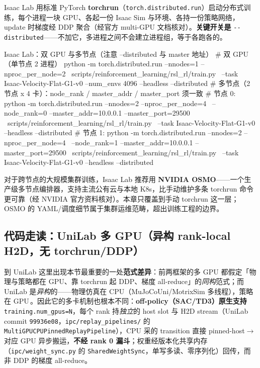 Isaac Lab 用标准 PyTorch \textbf{torchrun}（\verb|torch.distributed.run|）启动分布式训练，每个进程一块 GPU、各起一份 Isaac Sim 与环境、各持一份策略网络，update 时梯度经 DDP 聚合（经官方 multi-GPU 文档核对）\cite{mittal2025isaaclab}。\textbf{关键开关是} \verb|--distributed|——不加它，多进程之间不会建立进程组，等于各跑各的。

\begin{codebox}[bash]{Isaac Lab：双 GPU 与多节点（注意 --distributed 与 master 地址）}
# 双 GPU（单节点 2 进程）
python -m torch.distributed.run --nnodes=1 --nproc_per_node=2 \
    scripts/reinforcement_learning/rsl_rl/train.py \
    --task Isaac-Velocity-Flat-G1-v0 --num_envs 4096 --headless --distributed
# 多节点（2 节点 x 4 卡）：node_rank / master_addr / master_port 须一致
# 节点 0:
python -m torch.distributed.run --nnodes=2 --nproc_per_node=4 \
    --node_rank=0 --master_addr=10.0.0.1 --master_port=29500 \
    scripts/reinforcement_learning/rsl_rl/train.py \
    --task Isaac-Velocity-Flat-G1-v0 --headless --distributed
# 节点 1:
python -m torch.distributed.run --nnodes=2 --nproc_per_node=4 \
    --node_rank=1 --master_addr=10.0.0.1 --master_port=29500 \
    scripts/reinforcement_learning/rsl_rl/train.py \
    --task Isaac-Velocity-Flat-G1-v0 --headless --distributed
\end{codebox}

\begin{note}[大规模集群（$>8$ GPU）：NVIDIA OSMO]
对于跨节点的大规模集群训练，Isaac Lab 推荐用 \textbf{NVIDIA OSMO}——一个生产级多节点编排器，支持主流公有云与本地 K8s，比手动维护多条 torchrun 命令更可靠（经 NVIDIA 官方资料核对）\cite{mittal2025isaaclab}。本章只覆盖到手动 torchrun 这一层；OSMO 的 YAML/调度细节属于集群运维范畴，超出训练工程的边界。
\end{note}

\subsection{代码走读：UniLab 多 GPU（异构 rank-local H2D，无 torchrun/DDP）}
\label{sec:rlmc-ls-unilab-multigpu}

到 UniLab 这里出现本节最重要的一处\textbf{范式差异}：前两框架的多 GPU 都假定「物理与策略都在 GPU、靠 torchrun 起 DDP、梯度 all-reduce」的\emph{同构}范式；而 UniLab 是\emph{异构}的——物理仿真在 CPU（MuJoCoUni/MotrixSim 多线程），策略在 GPU\,\cite{unilab2026}。因此它的多卡机制也根本不同：\textbf{off-policy（SAC/TD3）原生支持} \verb|training.num_gpus=N|，每个 rank 持\emph{独立}的 host slot 与 H2D stream（UniLab commit \texttt{99936e08}，\verb|ipc/replay_pipelines/| 的 \verb|MultiGPUCPUPinnedReplayPipeline|），CPU 采的 transition 直接 pinned-host$\to$对应 GPU 异步搬运，\textbf{不经 rank 0 漏斗}；权重经版本化共享内存（\verb|ipc/weight_sync.py| 的 \verb|SharedWeightSync|，单写多读、零序列化）回传，而非 DDP 的梯度 all-reduce。

